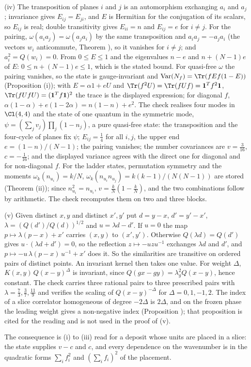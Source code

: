 (iv) The transposition of planes $i$ and $j$ is an automorphism exchanging $a_{i}$ and $a_{j}$; invariance gives $E_{ij} = E_{ji}$, and $E$ is Hermitian for the conjugation of its scalars, so $E_{ij}$ is real; double transitivity gives $E_{ii} = n$ and $E_{ij} = e$ for $i \ne j$. For the pairing, $\omega(a_{i}a_{j}) = \omega(a_{j}a_{i})$ by the same transposition and $a_{i}a_{j} = -a_{j}a_{i}$ (the vectors $w_{i}$ anticommute, Theorem ), so it vanishes for $i \ne j$; and $a_{i}^{2} = Q(w_{i}) = 0$. From $0 \le E \le 1$ and the eigenvalues $n - e$ and $n + (N - 1)e$ of $E$: $0 \le n + (N - 1)e \le 1$, which is the stated bound. For quasi-free $\omega$ the pairing vanishes, so the state is gauge-invariant and $\mathrm{Var}(N_{f}) = \Tr(fEf(1 - E))$ (Proposition (i)); with $E = \alpha 1 + eU$ and $\Tr(f^{2}U) = \Tr(fUf) = \mathbf{1}^{T}f^{2}\mathbf{1}$, $\Tr(fUfU) = (\mathbf{1}^{T}f\mathbf{1})^{2}$ the trace is the displayed expression; for diagonal $f$, $\alpha(1 - \alpha) + e(1 - 2\alpha) = n(1 - n) + e^{2}$. The check realises four modes in $\Cl(4,4)$ and the state of one quantum in the symmetric mode, $\psi = (\sum_{j}v_{j})\prod_{j}(1 - n_{j})$, a pure quasi-free state: the transposition and the four-cycle of planes fix $\psi$; $E_{ij} = \tfrac14$ for all $i, j$, the upper end $e = (1 - n)/(N - 1)$; the pairing vanishes; the number covariances are $v = \tfrac{3}{16}$, $c = -\tfrac{1}{16}$; and the displayed variance agrees with the direct one for diagonal and for non-diagonal $f$. For the ladder states, permutation symmetry and the moments $\omega_{k}(n_{u_{i}}) = k/N$, $\omega_{k}(n_{u_{i}}n_{u_{j}}) = k(k - 1)/(N(N - 1))$ are stored (Theorem (ii)); since $n_{u_{i}}^{2} = n_{u_{i}}$, $v = \tfrac kN(1 - \tfrac kN)$, and the two combinations follow by arithmetic. The check recomputes them on two and three blocks.

(v) Given distinct $x, y$ and distinct $x', y'$ put $d = y - x$, $d' = y' - x'$, $\lambda = (Q(d')/Q(d))^{1/2}$ and $u = \lambda d - d'$. If $u = 0$ the map $p \mapsto \lambda(p - x) + x'$ carries $(x, y)$ to $(x', y')$. Otherwise $Q(\lambda d) = Q(d')$ gives $u \cdot (\lambda d + d') = 0$, so the reflection $z \mapsto -uzu^{-1}$ exchanges $\lambda d$ and $d'$, and $p \mapsto -u\,\lambda(p - x)\,u^{-1} + x'$ does it. So the similarities are transitive on ordered pairs of distinct points. An invariant kernel then takes one value. For weight $\Delta$, $K(x, y)\,Q(x - y)^{\Delta}$ is invariant, since $Q(gx - gy) = \lambda_{g}^{2}Q(x - y)$, hence constant. The check carries three rational pairs to three prescribed pairs with $\lambda = \tfrac73, \tfrac37, \tfrac{11}{9}$ and verifies the scaling of $Q(x - y)^{-\Delta}$ for $\Delta = 0, 1, -1, 2$. The index of a slice correlator homogeneous of degree $-2\Delta$ is $2\Delta$, and on the frozen phase the leading weight gives a non-negative index (Proposition ); that proposition is cited for the reading and is not used in the proof of (v).

The consequence is (i) to (iii) read for a deposit whose units are placed in a slice: the state supplies $v - c$ and $c$, and every dependence on the wavenumber is in the quadratic forms $\sum_{i}f_{i}^{2}$ and $(\sum_{i}f_{i})^{2}$ of the placement.
